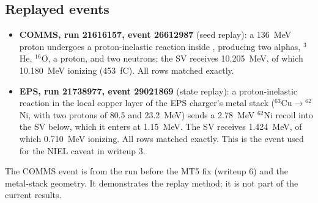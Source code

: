 \subsection{Replayed events}
\begin{itemize}
  \item \textbf{COMMS, run 21616157, event \num{26612987}} (seed replay): a \SI{136}{MeV} proton undergoes a proton-inelastic reaction inside , producing two alphas, $^3$He, $^{16}$O, a proton, and two neutrons; the SV receives \SI{10.205}{MeV}, of which \SI{10.180}{MeV} ionizing (\SI{453}{fC}). All rows matched exactly.
  \item \textbf{EPS, run 21738977, event \num{29021869}} (state replay): a proton-inelastic reaction in the local copper layer of the EPS charger's metal stack ($^{63}$Cu$\to{}^{62}$Ni, with two protons of 80.5 and \SI{23.2}{MeV}) sends a \SI{2.78}{MeV} $^{62}$Ni recoil into the SV below, which it enters at \SI{1.15}{MeV}. The SV receives \SI{1.424}{MeV}, of which \SI{0.710}{MeV} ionizing. All rows matched exactly. This is the event used for the NIEL caveat in writeup 3.
\end{itemize}
The COMMS event is from the run before the MT5 fix (writeup 6) and the metal-stack geometry. It demonstrates the replay method; it is not part of the current results.



